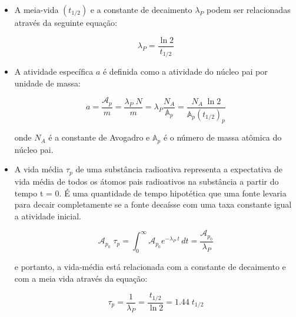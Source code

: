 \documentclass[11pt,a4paper]{article}
\begin{document}
\begin{itemize}
                \item A meia-vida $(t_{1/2})$ e a constante de decaimento $\lambda_P$ podem ser relacionadas através da seguinte equação:
                
                    \begin{equation}
                        \lambda_P = \frac{\ln 2}{t_{1/2}}
                    \end{equation}

                \item A atividade específica $a$ é definida como a atividade do núcleo pai por unidade de massa:
                
                    \begin{equation}
                        a = \frac{\mathcal{A}_p}{m} = \frac{\lambda_P \; N}{m} = 
                        \lambda_P \frac{N_A}{\mathbb{A}_p} = \frac{N_A \; \ln 2}{\mathbb{A}_p (t_{1/2})_p}
                    \end{equation}
                
                    onde $N_A$ é a constante de Avogadro e $\mathbb{A}_p$ é o número de massa atômica do núcleo pai.
                
                \item A vida média $\tau_p$ de uma substância radioativa representa a expectativa de vida média de todos os átomos pais radioativos na substância a partir do tempo t = 0. É uma quantidade de tempo hipotética que uma fonte levaria para decair completamente se a fonte decaísse com uma taxa constante igual a atividade inicial.
                
                    \begin{equation}
                        \mathcal{A}_{p_0} \; \tau_p = 
                        \int_{0}^{\infty} \mathcal{A}_{p_0} e^{-\lambda_P \; t} \,dt = 
                        \frac{\mathcal{A}_{p_0}}{\lambda_P}
                    \end{equation}

                e portanto, a vida-média está relacionada com a constante de decaimento e com a meia vida através da equação:

                    \begin{equation}
                        \tau_p = \frac{1}{\lambda_P} = \frac{t_{1/2}}{\ln 2} = 1.44 \; t_{1/2}
                    \end{equation}
            \end{itemize}
\end{document}
